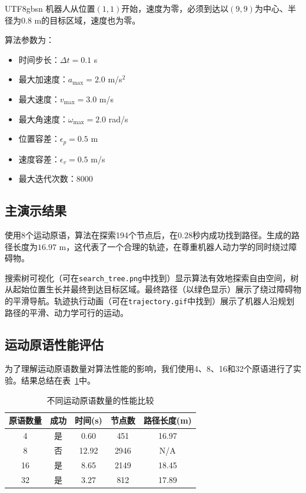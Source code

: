 \documentclass[11pt]{article}
\begin{document}
\begin{CJK}{UTF8}{gbsn}
机器人从位置$(1, 1)$开始，速度为零，必须到达以$(9, 9)$为中心、半径为$0.8$ m的目标区域，速度也为零。

算法参数为：
\begin{itemize}
    \item 时间步长：$\Delta t = 0.1$ s
    \item 最大加速度：$a_{\max} = 2.0$ m/s$^2$
    \item 最大速度：$v_{\max} = 3.0$ m/s
    \item 最大角速度：$\omega_{\max} = 2.0$ rad/s
    \item 位置容差：$\epsilon_p = 0.5$ m
    \item 速度容差：$\epsilon_v = 0.5$ m/s
    \item 最大迭代次数：$8000$
\end{itemize}

\subsection{主演示结果}

使用8个运动原语，算法在探索194个节点后，在$0.28$秒内成功找到路径。生成的路径长度为$16.97$ m，这代表了一个合理的轨迹，在尊重机器人动力学的同时绕过障碍物。

搜索树可视化（可在\texttt{search\_tree.png}中找到）显示算法有效地探索自由空间，树从起始位置生长并最终到达目标区域。最终路径（以绿色显示）展示了绕过障碍物的平滑导航。轨迹执行动画（可在\texttt{trajectory.gif}中找到）展示了机器人沿规划路径的平滑、动力学可行的运动。

\subsection{运动原语性能评估}

为了理解运动原语数量对算法性能的影响，我们使用4、8、16和32个原语进行了实验。结果总结在表~\ref{tab:primitives}中。

\begin{table}[H]
\centering
\begin{tabular}{|c|c|c|c|c|}
\hline
\textbf{原语数量} & \textbf{成功} & \textbf{时间(s)} & \textbf{节点数} & \textbf{路径长度(m)} \\
\hline
4 & 是 & 0.60 & 451 & 16.97 \\
8 & 否 & 12.92 & 2946 & N/A \\
16 & 是 & 8.65 & 2149 & 18.45 \\
32 & 是 & 3.27 & 812 & 17.89 \\
\hline
\end{tabular}
\caption{不同运动原语数量的性能比较}
\label{tab:primitives}
\end{table}


\end{CJK}
\end{document}
